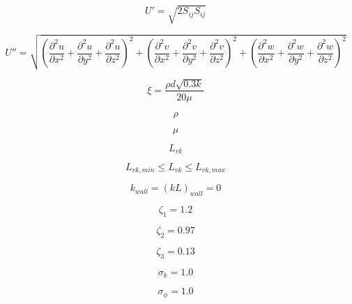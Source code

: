 \begin{equation}
U' = \sqrt{2 S_{ij} S_{ij}}
\end{equation}

\begin{equation}
U'' = \sqrt{
  \left(\frac{\partial^2u}{\partial x^2} + \frac{\partial^2u}{\partial y^2} + \frac{\partial^2u}{\partial z^2} \right)^2 +
  \left(\frac{\partial^2v}{\partial x^2} + \frac{\partial^2v}{\partial y^2} + \frac{\partial^2v}{\partial z^2} \right)^2 +
  \left(\frac{\partial^2w}{\partial x^2} + \frac{\partial^2w}{\partial y^2} + \frac{\partial^2w}{\partial z^2} \right)^2 }
\end{equation}

\begin{equation}
\xi = \frac{\rho d \sqrt{0.3 k}}{20 \mu}
\end{equation}

\begin{equation}
\rho
\end{equation}

\begin{equation}
\mu
\end{equation}

\begin{equation}
L_{vk}
\end{equation}

\begin{equation}
L_{vk,min} \leq L_{vk} \leq L_{vk,max}
\end{equation}

\begin{equation}
k_{wall} = (kL)_{wall} = 0
\end{equation}

\begin{equation}
\zeta_1 = 1.2
\end{equation}

\begin{equation}
\zeta_2 = 0.97
\end{equation}

\begin{equation}
\zeta_3 = 0.13
\end{equation}

\begin{equation}
\sigma_k = 1.0
\end{equation}

\begin{equation}
\sigma_{\phi} = 1.0
\end{equation}

